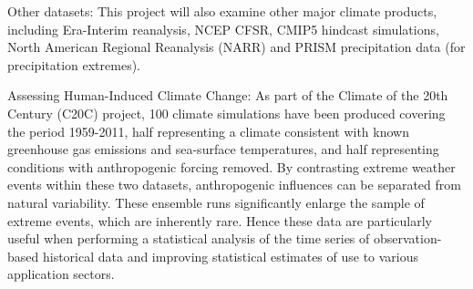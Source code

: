 Other datasets:  This project will also examine other major climate products, including Era-Interim reanalysis, NCEP CFSR, CMIP5 hindcast simulations, North American Regional Reanalysis (NARR) and PRISM precipitation data (for precipitation extremes).

Assessing Human-Induced Climate Change:  As part of the Climate of the 20th Century (C20C) project, 100 climate simulations have been produced covering the period 1959-2011, half representing a climate consistent with known greenhouse gas emissions and sea-surface temperatures, and half representing conditions with anthropogenic forcing removed.  By contrasting extreme weather events within these two datasets, anthropogenic influences can be separated from natural variability. These ensemble runs significantly enlarge the sample of extreme events, which are inherently rare. Hence these data are particularly useful when performing a statistical analysis of the time series of observation-based historical data and improving statistical estimates of use to various application sectors.
